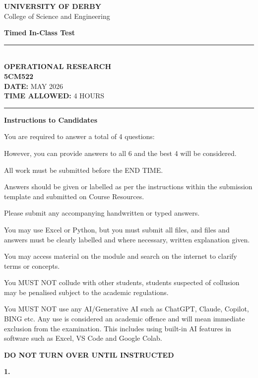 \documentclass[11pt,a4paper]{article}
\newcommand{\universityname}{UNIVERSITY OF DERBY}
\newcommand{\college}{College of Science and Engineering}
\newcommand{\examtitle}{Timed In-Class Test}
\newcommand{\moduletitle}{OPERATIONAL RESEARCH}
\newcommand{\modulecode}{5CM522}
\newcommand{\examdate}{MAY 2026}
\newcommand{\timeallowed}{4 HOURS}
\begin{document}
\begin{center}
{\large \textbf{\universityname}}\\
{\college}
\end{center}

\vspace{0.5em}

\begin{center}
{\Large \textbf{\examtitle}}\\[0.5em]
\rule{\textwidth}{0.4pt}\\[0.6em]
{\large \textbf{\moduletitle}}\\
{\large \textbf{\modulecode}}\\[0.4em]
\textbf{DATE:} \examdate\\
\textbf{TIME ALLOWED:} \timeallowed\\[0.3em]
\rule{\textwidth}{0.4pt}
\end{center}

\textbf{Instructions to Candidates}

You are required to answer a total of 4 questions:

However, you can provide answers to all 6 and the best 4 will be considered.

All work must be submitted before the END TIME.

Answers should be given or labelled as per the instructions within the submission template and submitted on Course Resources.

Please submit any accompanying handwritten or typed answers.

You may use Excel or Python, but you must submit all files, and files and answers must be clearly labelled and where necessary, written explanation given.

You may access material on the module and search on the internet to clarify terms or concepts.

You MUST NOT collude with other students, students suspected of collusion may be penalised subject to the academic regulations.

You MUST NOT use any AI/Generative AI such as ChatGPT, Claude, Copilot, BING etc. Any use is considered an academic offence and will mean immediate exclusion from the examination. This includes using built-in AI features in software such as Excel, VS Code and Google Colab.

\textbf{DO NOT TURN OVER UNTIL INSTRUCTED}

\newpage

\textbf{1.}
\end{document}
